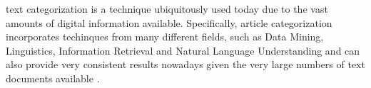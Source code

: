 \documentclass[10pt,journal,compsoc]{IEEEtran}
\begin{document}
%



 text categorization is a technique 
ubiquitously used today due to the vast amounts of digital 
information available.
Specifically, article categorization incorporates techinques from
many different fields, such as Data Mining, Linguistics, Information
Retrieval and Natural Language Understanding and can also provide 
very consistent results nowadays given the very large numbers of text 
documents available \cite{a5}.
\end{document}
